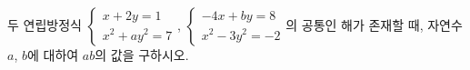 두 연립방정식 $\begin{cases} x+2y=1 \\ x^2+ay^2=7 \end{cases}$, $\begin{cases} -4x+by=8 \\ x^2-3y^2=-2 \end{cases}$의 공통인 해가 존재할 때, 자연수 $a$, $b$에 대하여 $ab$의 값을 구하시오.
